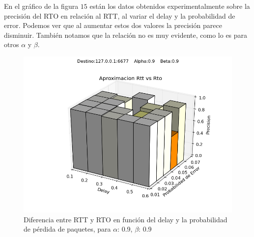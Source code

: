 En el gráfico de la figura $15$ están los datos obtenidos experimentalmente sobre la precisión del RTO en relación al RTT, al variar el delay y la probabilidad de error. Podemos ver que al aumentar estos dos valores la precisión parece disminuir. También notamos que la relación no es muy evidente, como lo es para otros $\alpha$ y $\beta$.

\begin{figure}[H]
  \centering	
	\includegraphics[scale=0.5]{../analisis/graficos_tablas/graficos_en_funcion_de_delay_probaerror/0.9-0.9/rtt_vs_rto.png}
  \caption{Diferencia entre RTT y RTO en funci\'on del delay y la probabilidad de pérdida de paquetes, para $\alpha$: 0.9, $\beta$: 0.9}
	\label{fig:histo-src-sitiotrabajo}
\end{figure}

